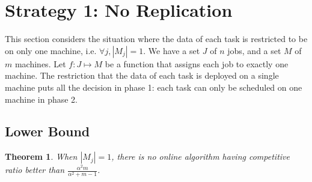 \documentclass[10pt, conference, compsocconf]{IEEEtran}
\newtheorem{theorem}{Theorem}
\begin{document}
\section{Strategy 1: No Replication}\label{sec4}


This section considers the situation where the data of each task is
restricted to be on only one machine, i.e. $\forall j, |M_j|=1$.  We
have a set $J$ of $ n$ jobs, and a set $M$ of $m$ machines.  Let $f :
J \mapsto M$ be a function that assigns each job to exactly one
machine. The restriction that the data of each task is deployed on a
single machine puts all the decision in phase 1: each task can only be
scheduled on one machine in phase 2.

\subsection{Lower Bound}


\begin{theorem}
\label{th:model1-lb}
  When $|M_j| = 1$, there is no online algorithm having competitive
  ratio better than $\frac{\alpha^{2}m }{\alpha^{2} + m-1}$.
\end{theorem}
 
\end{document}
